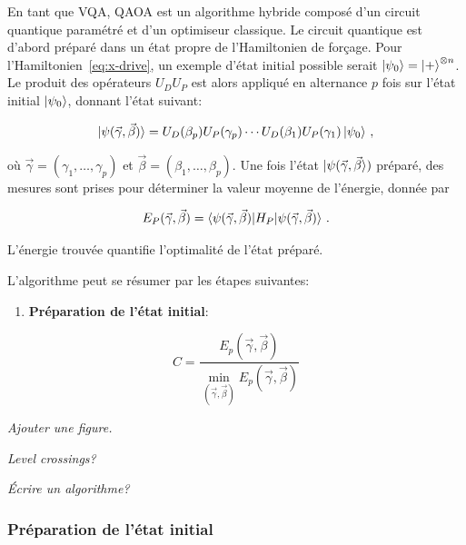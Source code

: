 En tant que VQA, QAOA est un algorithme hybride composé d'un circuit quantique paramétré et d'un optimiseur classique. Le circuit quantique est d'abord préparé dans un état propre de l'Hamiltonien de forçage. Pour l'Hamiltonien~\ref{eq:x-drive}, un exemple d'état initial possible serait $\ket{\psi_{0}} = \ket{+}^{\otimes n}$. Le produit des opérateurs $U_{D}U_{P}$ est alors appliqué en alternance $p$ fois sur l'état initial $\ket{\psi_{0}}$, donnant l'état suivant:

\begin{equation}
    \label{eq:final-state}
    \ket{\psi(\vec{\gamma}, \vec{\beta})} = U_D(\beta_p) U_P(\gamma_p) \cdots U_D(\beta_1) U_P(\gamma_1) \ket{\psi_{0}} \,,
\end{equation}

où $\vec{\gamma} = (\gamma_{1}, \dots, \gamma_{p})$ et $\vec{\beta} = (\beta_{1}, \dots, \beta_{p})$. Une fois l'état $\ket{\psi(\vec{\gamma}, \vec{\beta}})$ préparé, des mesures sont prises pour déterminer la valeur moyenne de l'énergie, donnée par

\begin{equation}
    E_{P} (\vec{\gamma}, \vec{\beta}) = \braket{ \psi(\vec{\gamma}, \vec{\beta}) | H_{P} | \psi(\vec{\gamma}, \vec{\beta}) } \,.
\end{equation}

L'énergie trouvée quantifie l'optimalité de l'état préparé.

L'algorithme peut se résumer par les étapes suivantes:

\begin{enumerate}[(1)]
    \item \textbf{Préparation de l'état initial}:
\end{enumerate}

\begin{equation}
    C = \frac{ E_{p} (\vec{\gamma}, \vec{\beta})}{\min_{(\vec{\gamma}, \vec{\beta})} E_{p} (\vec{\gamma}, \vec{\beta}) }
\end{equation}


\textcolor{mydarkred}{\textit{Ajouter une figure.}}

\textcolor{mydarkred}{\textit{Level crossings?}}

\textcolor{mydarkred}{\textit{Écrire un algorithme?}}


\subsubsection{Préparation de l'état initial}
\label{subsec:encodage-probleme}

